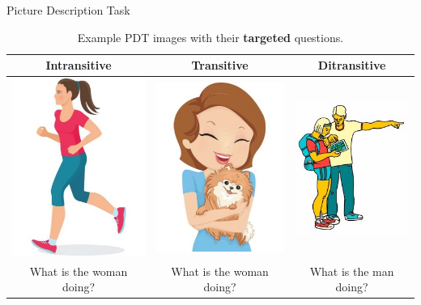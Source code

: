 \documentclass[final,14pt,t]{beamer}
\begin{document}
\begin{frame}{}
\begin{columns}[t]
\begin{column}{.33\linewidth}
\begin{minipage}[t][\textheight]{\linewidth}
\begin{block}{Picture Description Task}
\begin{center}
\begin{minipage}{.85\textwidth}
	\bigskip
\setlength{\fboxsep}{3pt}
\setlength{\fboxrule}{0pt}
\begin{table}[htb!]
\begin{center}
\begin{tabular}{|c|c|c|}
\hline
Intransitive & Transitive & Ditransitive \\
\hline
{\includegraphics[width=0.29\columnwidth]{../figures/I30.jpg}} & {\includegraphics[width=0.3\columnwidth]{../figures/I29.jpg}} & {\includegraphics[width=0.3\columnwidth]{../figures/I28.jpg}} \\
What is the woman doing? & What is the woman doing? & What is the man doing? \\
\hline
\end{tabular}
\medskip
\caption{\label{tab:example-pdt-items} Example PDT images with their \textbf{targeted} questions.} %
\end{center}
\end{table}


\end{minipage}
\end{center}
\end{block}
\end{minipage}
\end{column}
\end{columns}
\end{frame}
\end{document}
